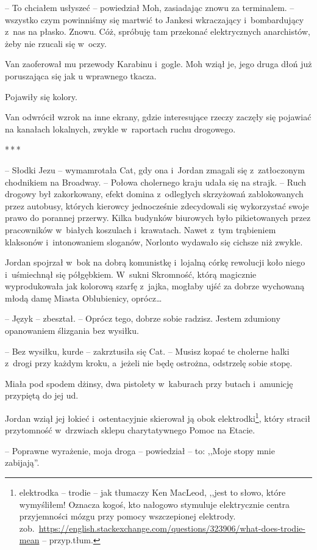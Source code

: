 \documentclass[oneside,polish,11pt,sfheadings]{mwbk}
\newcommand{\threeast}{\bigskip\par\centerline{*\,*\,*}\medskip\par}%
\begin{document}
-- To chciałem usłyszeć -- powiedział Moh, zasiadając znowu za terminalem.
-- wszyst\-ko czym powinniśmy się martwić to Jankesi wkraczający i~bombardujący z~nas na płasko. Znowu. Cóż, spróbuję tam przekonać
elektrycznych anarchistów, żeby nie rzucali się w~oczy.

Van zaoferował mu przewody Karabinu i~gogle. Moh wziął je, jego druga
dłoń już poruszająca się jak u wprawnego tkacza.

Pojawiły się kolory.

Van odwrócił wzrok na inne ekrany, gdzie interesujące rzeczy zaczęły się
pojawiać na kanałach lokalnych, zwykle w~raportach ruchu drogowego.
  \threeast 

-- Słodki Jezu -- wymamrotała Cat, gdy ona i~Jordan zmagali się z~zatłoczonym chodnikiem na Broadway. -- Połowa cholernego kraju udała się
na strajk. -- Ruch drogowy był zakorkowany, efekt domina z~odległych
skrzyżowań zablokowanych przez autobusy, których kierowcy jednocześnie
zdecydowali się wykorzystać swoje prawo do porannej przerwy. Kilka
budynków biurowych było pikietowanych przez pracowników w~białych
koszulach i~krawatach. Nawet z~tym trąbieniem klaksonów i~intonowaniem
sloganów, Norlonto wydawało się cichsze niż zwykle.

Jordan spojrzał w~bok na dobrą komunistkę i~lojalną córkę rewolucji koło
niego i~uśmiechnął się półgębkiem. W~sukni Skromność, którą magicznie
wyprodukowała jak kolorową szarfę z~jajka, mogłaby ujść za dobrze
wychowaną młodą damę Miasta Oblubienicy, oprócz\ldots

-- Język -- zbeształ. -- Oprócz tego, dobrze sobie radzisz. Jestem zdumiony
opanowaniem ślizgania bez wysiłku.

-- Bez wysiłku, kurde -- zakrztusiła się Cat. -- Musisz kopać te cholerne
halki z~drogi przy każdym kroku, a~jeżeli nie będę ostrożna, odstrzelę
sobie stopę.

Miała pod spodem dżinsy, dwa pistolety w~kaburach przy butach i~amunicję
przypiętą do jej ud.

Jordan wziął jej łokieć i~ostentacyjnie skierował ją obok elektrodki\footnote{elektrodka -- trodie -- jak tłumaczy Ken MacLeod, ,,jest to
słowo, które wymyśliłem! Oznacza kogoś, kto nałogowo stymuluje
elektrycznie centra przyjemności mózgu przy pomocy wszczepionej
elektrody.
zob.~\url{https://english.stackexchange.com/questions/323906/what-does-trodie-mean}
-- przyp.tłum.},
który stracił przytomność w~drzwiach sklepu charytatywnego Pomoc na
Etacie. 

-- Poprawne wyrażenie, moja droga -- powiedział -- to: ,,Moje stopy mnie
zabijają''.
\end{document}
